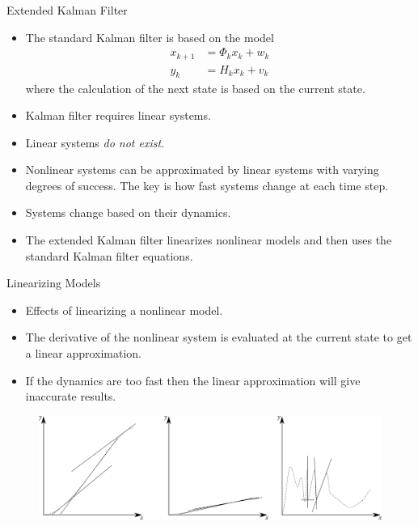 \documentclass[hyperref={pdfpagelabels=false}]{beamer}
\begin{document}
\begin{frame}{Extended Kalman Filter}
\begin{itemize}
\item The standard Kalman filter is based on the model
\begin{align*}
x_{k+1} &= \Phi_kx_k + w_k \\
y_k &= H_kx_k + v_k
\end{align*}
where the calculation of the next state is based on the current state.
\item Kalman filter requires linear systems.
\item Linear systems \textit{do not exist}.
\item Nonlinear systems can be approximated by linear systems with varying degrees of success. The key is how fast systems change at each time step.
\item Systems change based on their dynamics.
\item The extended Kalman filter linearizes nonlinear models and then uses the standard Kalman filter equations.
\end{itemize}
\end{frame}

\begin{frame}{Linearizing Models}
\begin{itemize}
\item Effects of linearizing a nonlinear model.
\item The derivative of the nonlinear system is evaluated at the current state to get a linear approximation.
\item If the dynamics are too fast then the linear approximation will give inaccurate results.
\end{itemize}
\begin{figure}[ht!]
    \centering
    \includegraphics[width=.9\textwidth]{images/KFLinearization2}
\end{figure}
\end{frame}
\end{document}
